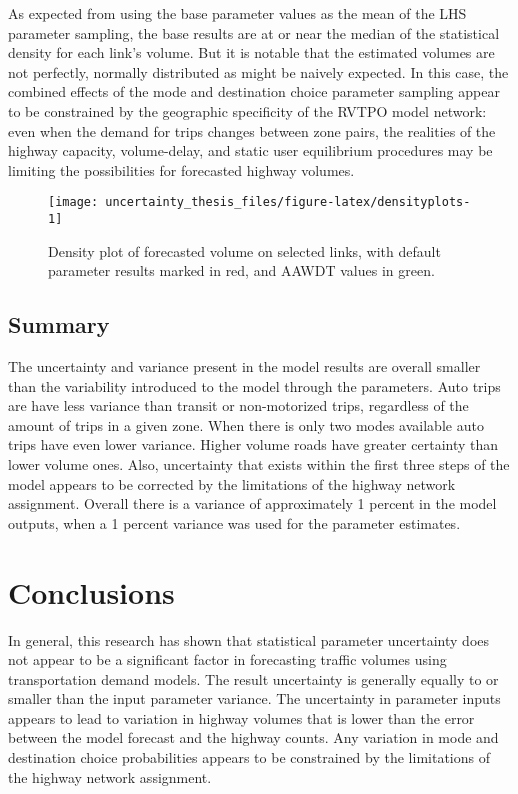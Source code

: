 \documentclass[fancy, masters, twoside]{byuthesis}
\begin{document}
As expected from using the base parameter values as the mean of the LHS parameter sampling, the base results are at or near the median of the statistical density for each link's volume. But it is notable that the estimated volumes are not perfectly, normally distributed as might be naively expected. In this case, the combined effects of the mode and destination choice parameter sampling appear to be constrained by the geographic specificity of the RVTPO model network: even when the demand for trips changes between zone pairs, the realities of the highway capacity, volume-delay, and static user equilibrium procedures may be limiting the possibilities for forecasted highway volumes.

\begin{sidewaysfigure}

{\centering \texttt{[image: uncertainty\_thesis\_files/figure-latex/densityplots-1]} 

}

\caption{Density plot of forecasted volume on selected links, with default parameter results marked in red, and AAWDT values in green.}\label{fig:densityplots}
\end{sidewaysfigure}

\hypertarget{summary}{%
\section{Summary}\label{summary}}

The uncertainty and variance present in the model results are overall smaller than the variability introduced to the model through the parameters. Auto trips are have less variance than transit or non-motorized trips, regardless of the amount of trips in a given zone. When there is only two modes available auto trips have even lower variance. Higher volume roads have greater certainty than lower volume ones. Also, uncertainty that exists within the first three steps of the model appears to be corrected by the limitations of the highway network assignment. Overall there is a variance of approximately 1 percent in the model outputs, when a 1 percent variance was used for the parameter estimates.

\hypertarget{conclusions}{%
\chapter{Conclusions}\label{conclusions}}

In general, this research has shown that statistical parameter uncertainty does not appear to be a significant factor in forecasting traffic volumes using transportation demand models. The result uncertainty is generally equally to or smaller than the input parameter variance. The uncertainty in parameter inputs appears to lead to variation in highway volumes that is lower than the error between the model forecast and the highway counts. Any variation in mode and destination choice probabilities appears to be constrained by the limitations of the highway network assignment.
\end{document}
